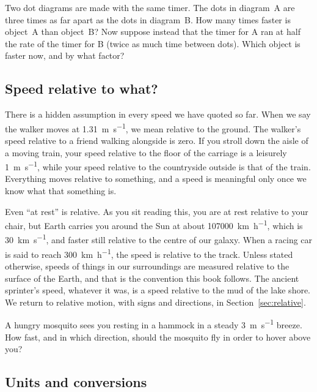 \documentclass[11pt,twoside,openany]{book}
\newcounter{check}[chapter]
\begin{document}
\begin{checkbox}
Two dot diagrams are made with the same timer. The dots in diagram~A are three times as far apart as the dots in diagram~B. How many times faster is object~A than object~B? Now suppose instead that the timer for A ran at half the rate of the timer for B (twice as much time between dots). Which object is faster now, and by what factor?
\end{checkbox}

\subsection{Speed relative to what?}

There is a hidden assumption in every speed we have quoted so far. When we say the walker moves at \SI{1.31}{\metre\per\second}, we mean relative to the ground. The walker's speed relative to a friend walking alongside is zero. If you stroll down the aisle of a moving train, your speed relative to the floor of the carriage is a leisurely \SI{1}{\metre\per\second}, while your speed relative to the countryside outside is that of the train. Everything moves relative to something, and a speed is meaningful only once we know what that something is.

Even ``at rest'' is relative. As you sit reading this, you are at rest relative to your chair, but Earth carries you around the Sun at about \SI{107000}{\kilo\metre\per\hour}, which is \SI{30}{\kilo\metre\per\second}, and faster still relative to the centre of our galaxy. When a racing car is said to reach \SI{300}{\kilo\metre\per\hour}, the speed is relative to the track. Unless stated otherwise, speeds of things in our surroundings are measured relative to the surface of the Earth, and that is the convention this book follows. The ancient sprinter's speed, whatever it was, is a speed relative to the mud of the lake shore. We return to relative motion, with signs and directions, in Section~\ref{sec:relative}.

\begin{checkbox}
A hungry mosquito sees you resting in a hammock in a steady \SI{3}{\metre\per\second} breeze. How fast, and in which direction, should the mosquito fly in order to hover above you?
\end{checkbox}

\subsection{Units and conversions}
\label{sec:units}
\end{document}
